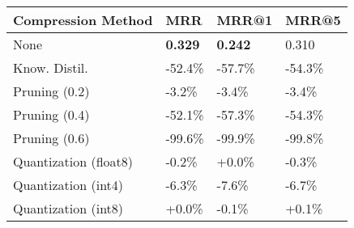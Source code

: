 \begin{tabular}{llll}
\toprule
\textbf{Compression Method} & \textbf{MRR} & \textbf{MRR@1} & \textbf{MRR@5} \\
\midrule
None & \textbf{0.329} & \textbf{0.242} & 0.310 \\
Know. Distil. & -52.4\% & -57.7\% & -54.3\% \\
Pruning (0.2) & -3.2\% & -3.4\% & -3.4\% \\
Pruning (0.4) & -52.1\% & -57.3\% & -54.3\% \\
Pruning (0.6) & -99.6\% & -99.9\% & -99.8\% \\
Quantization (float8) & -0.2\% & +0.0\% & -0.3\% \\
Quantization (int4) & -6.3\% & -7.6\% & -6.7\% \\
Quantization (int8) & +0.0\% & -0.1\% & +0.1\% \\
\bottomrule
\end{tabular}
